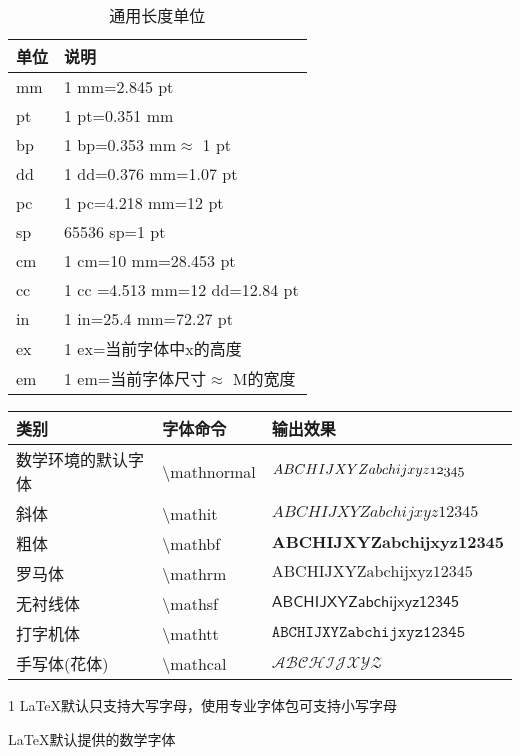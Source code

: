 \documentclass[UTF8,fontset=ubuntu]{ctexbook}
\begin{document}
\begin{table}[H]
\begin{tabular}{l l}
	\hline
	单位 & 说明\\
	\hline
	mm & 1 mm=2.845 pt\\
	pt & 1 pt=0.351 mm\\
	bp & 1 bp=0.353 mm$\approx$ 1 pt\\
	dd & 1 dd=0.376 mm=1.07 pt\\
	pc & 1 pc=4.218 mm=12 pt\\
	sp & 65536 sp=1 pt\\
	cm & 1 cm=10 mm=28.453 pt\\
	cc & 1 cc =4.513 mm=12 dd=12.84 pt\\
	in & 1 in=25.4 mm=72.27 pt\\
	ex & 1 ex=当前字体中x的高度\\
	em & 1 em=当前字体尺寸$\approx$ M的宽度\\
	\hline
\end{tabular}
\caption{通用长度单位}
\end{table}

\begin{threeparttable}
\begin{tabular}{l l l}
	\hline
	类别 & 字体命令 & 输出效果\\\hline
	数学环境的默认字体 & \textbackslash mathnormal & $\mathnormal{ABCHIJXYZabchijxyz12345}$\\
	斜体 & \textbackslash mathit & $\mathit{ABCHIJXYZabchijxyz12345}$\\
	粗体 & \textbackslash mathbf & $\mathbf{ABCHIJXYZabchijxyz12345}$\\
	罗马体 & \textbackslash mathrm & $\mathrm{ABCHIJXYZabchijxyz12345}$\\
	无衬线体 & \textbackslash mathsf & $\mathsf{ABCHIJXYZabchijxyz12345}$\\
	打字机体 & \textbackslash mathtt & $\mathtt{ABCHIJXYZabchijxyz12345}$\\
	手写体(花体)\tnote{1} & \textbackslash mathcal & $\mathcal{ABCHIJXYZ}$\\\hline
\end{tabular}
\begin{tablenotes}
	\item[1] LaTeX默认只支持大写字母，使用专业字体包可支持小写字母
\end{tablenotes}
\caption{LaTeX默认提供的数学字体}
\end{threeparttable}
\end{document}
